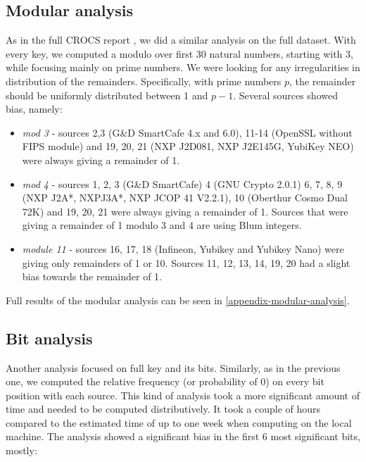 \subsection{Modular analysis}

As in the full CROCS report \cite{svenda_full}, we did a similar analysis on the full dataset. With every key, we computed a modulo over first 30 natural numbers, starting with 3, while focusing mainly on prime numbers. We were looking for any irregularities in distribution of the remainders. Specifically, with prime numbers $p$, the remainder should be uniformly distributed between 1 and $p-1$. Several sources showed bias, namely:

\begin{itemize}

\item \textit{mod 3} - sources 2,3 (G\&D SmartCafe 4.x and 6.0), 11-14 (OpenSSL without FIPS module) and 19, 20, 21 (NXP J2D081, NXP J2E145G, YubiKey NEO) were always giving a remainder of 1.

\item \textit{mod 4} - sources 1, 2, 3 (G\&D SmartCafe) 4 (GNU Crypto 2.0.1) 6, 7, 8, 9 (NXP J2A*, NXPJ3A*, NXP JCOP 41 V2.2.1), 10 (Oberthur Cosmo Dual 72K) and 19, 20, 21 were always giving a remainder of 1. Sources that were giving a remainder of 1 modulo 3 and 4 are using Blum integers.

\item \textit{module 11} - sources 16, 17, 18 (Infineon, Yubikey and Yubikey Nano) were giving only remainders of 1 or 10. Sources 11, 12, 13, 14, 19, 20 had a slight bias towards the remainder of 1.

\end{itemize}

\noindent
Full results of the modular analysis can be seen in \autoref{appendix-modular-analysis}.

\subsection{Bit analysis}

Another analysis focused on full key and its bits. Similarly, as in the previous one, we computed the relative frequency (or probability of 0) on every bit position with each source. This kind of analysis took a more significant amount of time and needed to be computed distributively. It took a couple of hours compared to the estimated time of up to one week when computing on the local machine. The analysis showed a significant bias in the first 6 most significant bits, mostly:

